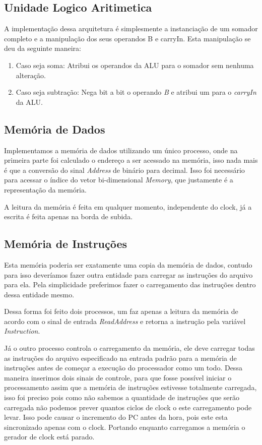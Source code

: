 \documentclass[12pt]{article}
\begin{document}
\subsection{Unidade Logico Aritimetica}

A implementação dessa arquitetura é simplesmente a instanciação de um somador completo e a manipulação dos seus operandos B e carryIn. Esta manipulação se deu da seguinte maneira:
\begin{enumerate}
 \item Caso seja soma: Atribui os operandos da ALU para o somador sem nenhuma alteração.
 \item Caso seja subtração: Nega bit a bit o operando \textit{B} e atribui um para o \textit{carryIn} da ALU.
\end{enumerate}

\subsection{Memória de Dados}

Implementamos a memória de dados utilizando um único processo, onde na primeira parte foi calculado o endereço a ser acessado na memória, isso nada mais é que a conversão do sinal \textit{Address} de binário para decimal. Isso foi necessário para acessar o índice do vetor bi-dimensional \textit{Memory}, que justamente é a representação da memória.

A leitura da memória é feita em qualquer momento, independente do clock, já a escrita é feita apenas na borda de subida.

\subsection{Memória de Instruções}

Esta memória poderia ser exatamente uma copia da memória de dados, contudo para isso deveríamos fazer outra entidade para carregar as instruções do arquivo para ela. Pela simplicidade preferimos fazer o carregamento das instruções dentro dessa entidade mesmo.

Dessa forma foi feito dois processos, um faz apenas a leitura da memória de acordo com o sinal de entrada \textit{ReadAddress} e retorna a instrução pela variável \textit{Instruction}.

Já o outro processo controla o carregamento da memória, ele deve carregar todas as instruções do arquivo especificado na entrada padrão para a memória de instruções antes de começar a execução do processador como um todo. 
Dessa maneira inserimos dois sinais de controle, para que fosse possível iniciar o processamento assim que a memória de instruções estivesse totalmente carregada, isso foi preciso pois como não sabemos a quantidade de instruções que serão carregada não podemos prever quantos ciclos de clock o este carregamento pode levar. Isso pode causar o incremento do PC antes da hora, pois este esta sincronizado apenas com o clock. Portando enquanto carregamos a memória o gerador de clock está parado.
\end{document}
